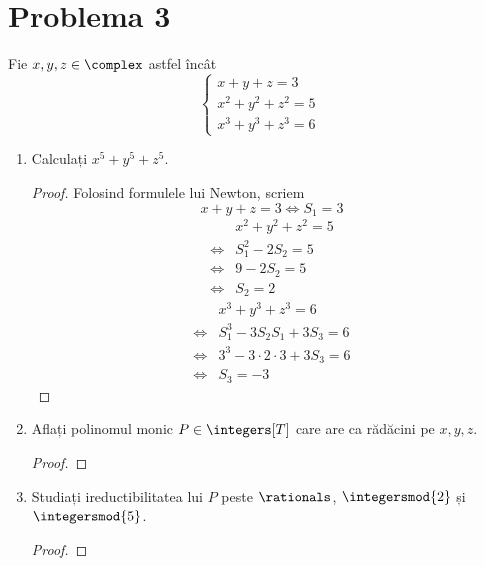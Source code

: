 \section*{Problema 3}

Fie \(x, y, z \in \complex\) astfel încât
\[
    \begin{cases}
        x + y + z = 3 \\
        x^2 + y^2 + z^2 = 5 \\
        x^3 + y^3 + z^3 = 6
    \end{cases}
\]

\begin{enumerate}
    \item Calculați \(x^5 + y^5 + z^5\).
    \begin{proof}
    Folosind formulele lui Newton, scriem
    \[x + y + z = 3 \iff S_1 = 3\]
    \begin{align*}
        & x^2 + y^2 + z^2 = 5 \\
        \iff & S_1^2 - 2 S_2 = 5 \\
        \iff & 9 - 2 S_2 = 5 \\
        \iff & S_2 = 2
    \end{align*}
    \begin{align*}
        & x^3 + y^3 + z^3 = 6 \\
        \iff & S_1^3 - 3 S_2 S_1 + 3 S_3 = 6 \\
        \iff & 3^3 - 3 \cdot 2 \cdot 3 + 3 S_3 = 6 \\
        \iff & S_3 = -3
    \end{align*}
    \end{proof}

    \item Aflați polinomul monic \(P \in \integers[T]\) care are ca rădăcini pe \(x, y, z\).
    \begin{proof}

    \end{proof}

    \item Studiați ireductibilitatea lui \(P\) peste \(\rationals\), \(\integersmod{2}\) și \(\integersmod{5}\).
    \begin{proof}

    \end{proof}
\end{enumerate}
